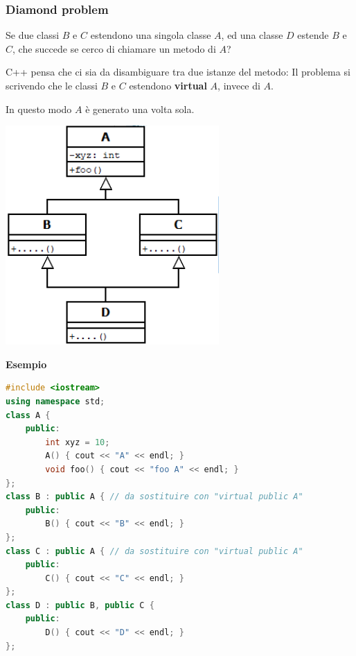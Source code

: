 \documentclass[a4paper,10pt]{article}
\begin{document}
\subsubsection{Diamond problem}\begin{multicols}{2}
                                
Se due classi $B$ e $C$ estendono una singola classe $A$, ed una classe $D$ estende $B$ e $C$, che succede se cerco di chiamare un metodo di $A$?

C++ pensa che ci sia da disambiguare tra due istanze del metodo: Il problema si scrivendo che le classi $B$ e $C$ estendono \textbf{virtual }$A$, invece di $A$.

In questo modo $A$ è generato una volta sola.\bigskip

\begin{center}
 
\includegraphics[scale = .6]{diamond}

\end{center}

\end{multicols}

\textbf{Esempio}

\begin{lstlisting}[language = c++]
#include <iostream>
using namespace std;
class A {
    public:
        int xyz = 10;
        A() { cout << "A" << endl; }
        void foo() { cout << "foo A" << endl; }
};
class B : public A { // da sostituire con "virtual public A"
    public:
        B() { cout << "B" << endl; }
};
class C : public A { // da sostituire con "virtual public A"
    public:
        C() { cout << "C" << endl; }
};
class D : public B, public C {
    public:
        D() { cout << "D" << endl; }
};
\end{lstlisting}
\end{document}
